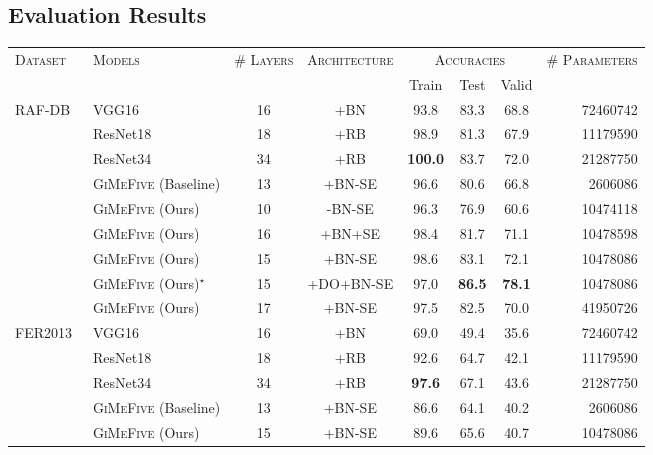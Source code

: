 \subsection{Evaluation Results}
\label{sec:evaluation:results}

\begin{table}[ht]
  \centering
  \begin{tabular}{@{}llcccccr@{}}
    \toprule 
    \multirow{2}{*}{\textsc{Dataset}}&\multirow{2}{*}{\textsc{Models}}&\multirow{2}{*}{\textsc{\# Layers}}&\multirow{2}{*}{\textsc{Architecture}} & \multicolumn{3}{c}{\textsc{Accuracies}} & \multirow{2}{*}{\textsc{\# Parameters}} \\
    \cline{5-7}
    &&&& Train & Test & Valid  &  \\
    \midrule
    \multirow{9}{*}{RAF-DB~\cite{li_reliable_2017,li2019reliable}} &VGG16~\cite{SimonyanZ14a} & 16 &+BN&93.8&83.3&68.8&72460742\\ 
    & ResNet18~\cite{HeZRS16} & 18 & +RB  & 98.9 & 81.3 & 67.9 & 11179590 \\
    & ResNet34~\cite{HeZRS16} & 34 & +RB  & \textbf{100.0} & 83.7 & 72.0 & 21287750 \\
    &\textsc{GiMeFive} (Baseline) & 13 & +BN-SE & 96.6 & 80.6 & 66.8 & 2606086 \\ 
    &\textsc{GiMeFive} (Ours) & 10 & -BN-SE & 96.3 & 76.9 & 60.6 & 10474118 \\
    &\textsc{GiMeFive} (Ours) & 16 & +BN+SE & 98.4 & 81.7 & 71.1 & 10478598 \\
    &\textsc{GiMeFive} (Ours) & 15 & +BN-SE & 98.6 & 83.1 & 72.1 & 10478086 \\
    &\textsc{GiMeFive} (Ours)\textcolor{LMUGreen}{$^\star$} & 15 & +DO+BN-SE & 97.0 & \textbf{86.5} & \textbf{78.1} & 10478086 \\
    &\textsc{GiMeFive} (Ours) & 17 & +BN-SE & 97.5 & 82.5 & 70.0 & 41950726 \\ 
    \midrule
    \multirow{7}{*}{FER2013~\cite{BarsoumZCZ16}} & VGG16~\cite{SimonyanZ14a} & 16 & +BN & 69.0 & 49.4 & 35.6 & 72460742 \\
    & ResNet18~\cite{HeZRS16} & 18 & +RB  & 92.6 & 64.7 & 42.1 & 11179590 \\
    & ResNet34~\cite{HeZRS16} & 34 & +RB  & \textbf{97.6} & 67.1 & 43.6 & 21287750 \\
    & \textsc{GiMeFive} (Baseline) & 13 & +BN-SE & 86.6 & 64.1 & 40.2 & 2606086 \\
    &\textsc{GiMeFive} (Ours) & 15 & +BN-SE & 89.6 & 65.6 & 40.7 & 10478086 \\

\end{tabular}
\end{table}
